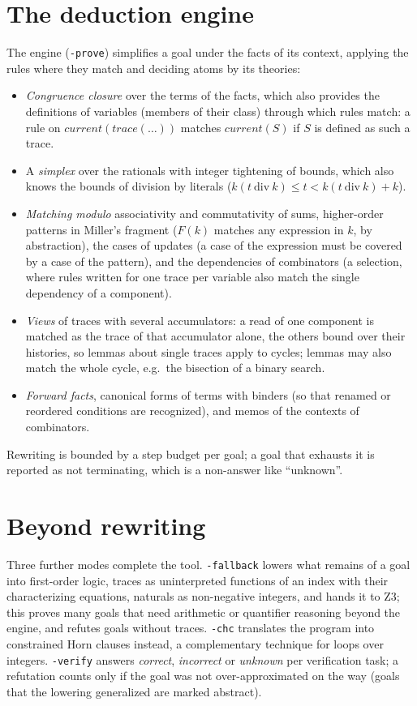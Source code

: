 \documentclass[a4paper,11pt]{article}
\begin{document}
\section{The deduction engine}
\label{sec:engine}

The engine (\texttt{-prove}) simplifies a goal under the facts of its context, applying the rules where they match
and deciding atoms by its theories:
\begin{itemize}
\item \emph{Congruence closure} over the terms of the facts, which also provides the definitions of variables
  (members of their class) through which rules match: a rule on $\mathit{current}(\mathit{trace}(\dots))$ matches
  $\mathit{current}(S)$ if $S$ is defined as such a trace.
\item A \emph{simplex} over the rationals with integer tightening of bounds, which also knows the bounds of
  division by literals ($k (t\ \mathrm{div}\ k) \le t < k (t\ \mathrm{div}\ k) + k$).
\item \emph{Matching modulo} associativity and commutativity of sums, higher-order patterns in Miller's fragment
  ($F(k)$ matches any expression in $k$, by abstraction), the cases of updates (a case of the expression must be
  covered by a case of the pattern), and the dependencies of combinators (a selection, where rules written for one
  trace per variable also match the single dependency of a component).
\item \emph{Views} of traces with several accumulators: a read of one component is matched as the trace of that
  accumulator alone, the others bound over their histories, so lemmas about single traces apply to cycles; lemmas
  may also match the whole cycle, e.g.\ the bisection of a binary search.
\item \emph{Forward facts}, canonical forms of terms with binders (so that renamed or reordered conditions are
  recognized), and memos of the contexts of combinators.
\end{itemize}
Rewriting is bounded by a step budget per goal; a goal that exhausts it is reported as not terminating, which is
a non-answer like ``unknown''.

\section{Beyond rewriting}

Three further modes complete the tool. \texttt{-fallback} lowers what remains of a goal into first-order logic,
traces as uninterpreted functions of an index with their characterizing equations, naturals as non-negative
integers, and hands it to Z3; this proves many goals that need arithmetic or quantifier reasoning beyond the engine,
and refutes goals without traces. \texttt{-chc} translates the program into constrained Horn clauses instead, a
complementary technique for loops over integers. \texttt{-verify} answers \emph{correct}, \emph{incorrect} or
\emph{unknown} per verification task; a refutation counts only if the goal was not over-approximated on the way
(goals that the lowering generalized are marked abstract).
\end{document}

